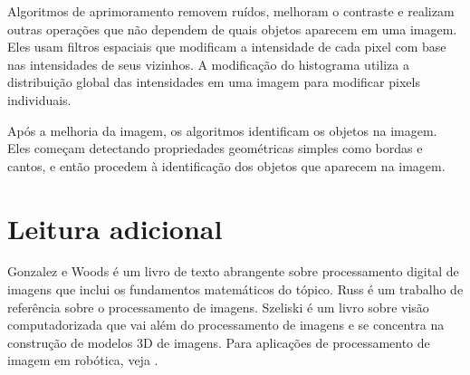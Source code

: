 Algoritmos de aprimoramento removem ruídos, melhoram o contraste e realizam outras operações que não dependem de quais objetos aparecem em uma imagem. Eles usam filtros espaciais que modificam a intensidade de cada pixel com base nas intensidades de seus vizinhos. A modificação do histograma utiliza a distribuição global das intensidades em uma imagem para modificar pixels individuais.

Após a melhoria da imagem, os algoritmos identificam os objetos na imagem. Eles começam detectando propriedades geométricas simples como bordas e cantos, e então procedem à identificação dos objetos que aparecem na imagem.

\section{Leitura adicional}

Gonzalez e Woods \cite{GW} é um livro de texto abrangente sobre processamento digital de imagens que inclui os fundamentos matemáticos do tópico. Russ \cite{russ} é um trabalho de referência sobre o processamento de imagens. Szeliski \cite{szeliski} é um livro sobre visão computadorizada que vai além do processamento de imagens e se concentra na construção de modelos 3D de imagens. Para aplicações de processamento de imagem em robótica, veja \cite[Chapter~4]{siegwart}.
